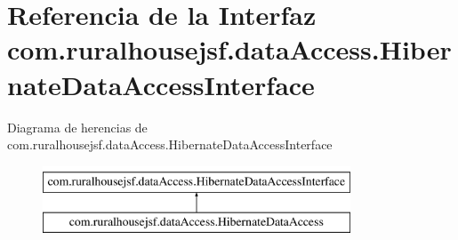 \hypertarget{a00148}{}\section{Referencia de la Interfaz com.\+ruralhousejsf.\+data\+Access.\+Hibernate\+Data\+Access\+Interface}
\label{a00148}
Diagrama de herencias de com.\+ruralhousejsf.\+data\+Access.\+Hibernate\+Data\+Access\+Interface\begin{figure}[H]
\begin{center}
\leavevmode
\includegraphics[height=2.000000cm]{a00148}
\end{center}
\end{figure}
